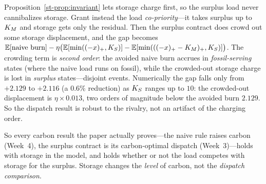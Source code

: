 \begin{corollary}\label{st-cor:rivalry}
Proposition~\ref{st-prop:invariant} lets storage charge first, so the surplus load never
cannibalizes storage. Grant instead the load \emph{co-priority}---it takes surplus up to $K_M$
and storage gets only the residual. Then the surplus contract does crowd out some storage
displacement, and the gap becomes
$\mathbb{E}[\text{naive burn}]-\eta\big(\mathbb{E}[\min((-x)_+,K_S)]-\mathbb{E}[\min(((-x)_+-K_M)_+,K_S)]\big)$.
The crowding term is \emph{second order}: the avoided naive burn accrues in \emph{fossil-serving}
states (where the naive load runs on fossil), while the crowded-out storage charge is lost in
\emph{surplus} states---disjoint events. Numerically the gap falls only from $+2.129$ to
$+2.116$ (a $0.6\%$ reduction) as $K_S$ ranges up to $10$: the crowded-out displacement is
$\eta\times0.013$, two orders of magnitude below the avoided burn $2.129$. So the dispatch
result is robust to the rivalry, not an artifact of the charging order.
\end{corollary}
So every carbon result the paper actually proves---the naive rule raises carbon
(Week~4), the surplus contract is its carbon-optimal dispatch (Week~3)---holds with storage in
the model, and holds whether or not the load competes with storage for the surplus. Storage
changes the \emph{level} of carbon, not the \emph{dispatch comparison}.

